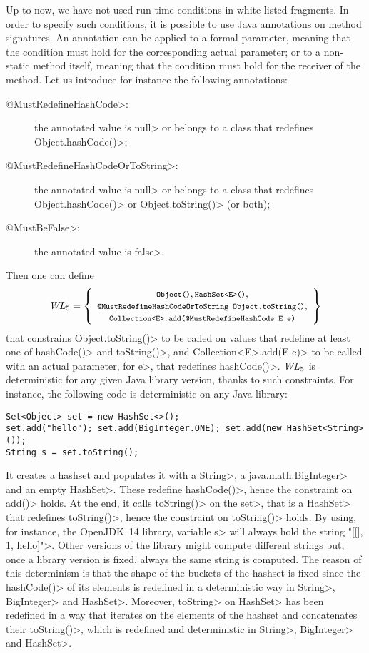 Up to now, we have not used run-time conditions in white-listed fragments.
In order to specify such conditions, it is possible to use Java annotations on
method signatures. An annotation can be applied to a formal parameter, meaning that
the condition must hold for the corresponding actual parameter; or to a non-static method
itself, meaning that the condition must hold for the receiver of the method.
Let us introduce for instance the following annotations:
%
\begin{description}
\item[\<@MustRedefineHashCode>:] the annotated value is \<null> or belongs to a class that redefines
  \<Object.hashCode()>;
\item[\<@MustRedefineHashCodeOrToString>:] the annotated value is \<null> or belongs to a class that redefines
  \<Object.hashCode()> or \<Object.toString()> (or both);
\item[\<@MustBeFalse>:] the annotated value is \<false>.
\end{description}
%
Then one can define
%
\[
\wl_5=\left\{\begin{array}{c}
\mbox{\<Object()>}, \mbox{\<HashSet$\text{<}$E$\text{>}$()>},\\
\mbox{\<@MustRedefineHashCodeOrToString Object.toString()>},\\
\mbox{\<Collection$\text{<}$E$\text{>}$.add(@MustRedefineHashCode E e)>}
\end{array}\right\}
\]
%
that constrains \<Object.toString()> to be called on values that redefine
at least one of \<hashCode()> and \<toString()>, and
\<Collection$\text{<}$E$\text{>}$.add(E e)> to be called
with an actual parameter, for \<e>, that redefines \<hashCode()>. $\mathit{WL}_5$ is deterministic
for any given Java library version, thanks
to such constraints. For instance, the following code is deterministic
on any Java library:

{\small\begin{verbatim}
Set<Object> set = new HashSet<>();
set.add("hello"); set.add(BigInteger.ONE); set.add(new HashSet<String>());
String s = set.toString();
\end{verbatim}}

\noindent
It creates a hashset and populates it with a
\<String>, a \<java.math.BigInteger> and an empty \<HashSet>. These
redefine \<hashCode()>, hence the constraint on \<add()> holds.
At the end, it calls \<toString()> on the
\<set>, that is a \<HashSet> that redefines \<toString()>,
hence the constraint
on \<toString()> holds. By using, for instance, the
OpenJDK~14 library, variable \<s> will always hold the string
\<"[[], 1, hello]">. Other versions of the library might compute different strings but,
once a library version is fixed, always the same string is computed.
The reason of this determinism is that the shape of the buckets of the hashset is fixed
since the \<hashCode()> of its elements is redefined in a deterministic way in
\<String>, \<BigInteger> and \<HashSet>. Moreover, \<toString> on \<HashSet> has been
redefined in a way that iterates on the elements of the hashset and concatenates
their \<toString()>, which is redefined and deterministic in
\<String>, \<BigInteger> and \<HashSet>.

